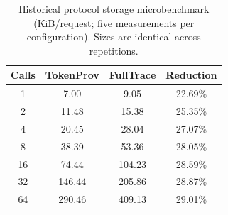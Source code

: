 \begin{table}[!t]
\centering
\caption{Historical protocol storage microbenchmark (KiB/request; five measurements per configuration). Sizes are identical across repetitions.}
\label{tab:d-fulltrace-storage}
\footnotesize
\renewcommand{\arraystretch}{1.10}
\begin{tabular}{cccc}
\toprule
\textbf{Calls} & \textbf{TokenProv} & \textbf{FullTrace} & \textbf{Reduction} \\
\midrule
1 & 7.00 & 9.05 & 22.69\% \\
2 & 11.48 & 15.38 & 25.35\% \\
4 & 20.45 & 28.04 & 27.07\% \\
8 & 38.39 & 53.36 & 28.05\% \\
16 & 74.44 & 104.23 & 28.59\% \\
32 & 146.44 & 205.86 & 28.87\% \\
64 & 290.46 & 409.13 & 29.01\% \\
\bottomrule
\end{tabular}
\end{table}
